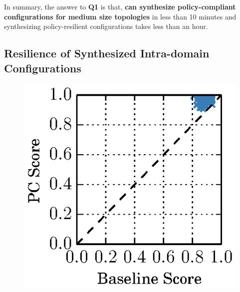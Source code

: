 In summary, the answer to \textbf{Q1} is that,
\textbf{\name can synthesize policy-compliant configurations for medium size
topologies} in less than 10 minutes and synthesizing policy-resilient 
configurations takes less than an hour.


\subsection{Resilience of Synthesized Intra-domain Configurations} \label{sec:reseval}

\begin{figure}
	\begin{center}
	\vspace{-6mm}
		\includegraphics[width=0.4\columnwidth]{figures/ospfbaselineresilience.eps}
	\end{center} 
\end{figure}
